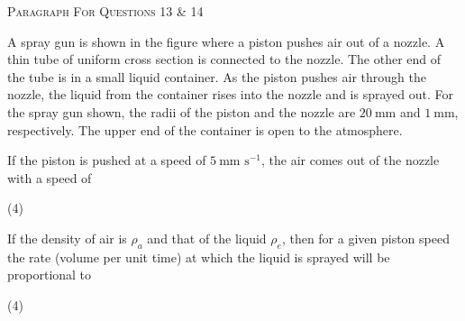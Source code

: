 
\begin{center}
    \textsc{Paragraph For Questions 13 \& 14}
\end{center}

A spray gun is shown in the figure where a piston pushes air out of a nozzle. A thin tube of uniform cross section is connected to the nozzle. The other end of the tube is in a small liquid container. As the piston pushes air through the nozzle, the liquid from the container rises into the nozzle and is sprayed out. For the spray gun shown, the radii of the piston and the nozzle are $20\: \text{mm}$ and $1\: \text{mm}$, respectively. The upper end of the container is open to the atmosphere.

\begin{center}
\end{center}

\item If the piston is pushed at a speed of $5\: \text{mm s}^{-1}$, the air comes out of the nozzle with a speed of
    \begin{tasks}(4)
    \end{tasks}

\item If the density of air is $\rho_a$ and that of the liquid $\rho_e$, then for a given piston speed the rate (volume per unit time) at which the liquid is sprayed will be proportional to
    \begin{tasks}(4)
    \end{tasks}

